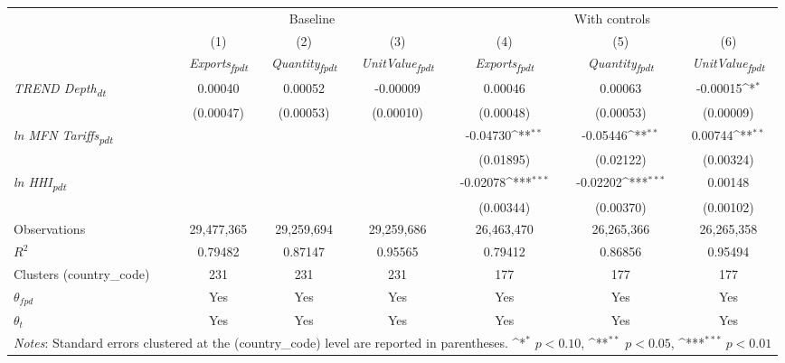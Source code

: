{
\def\sym#1{\ifmmode^{#1}\else\(^{#1}\)\fi}
\begin{tabular}{l*{6}{c}}
\toprule
&\multicolumn{3}{c}{Baseline}&\multicolumn{3}{c}{With controls}\\\cmidrule(lr){2-4}\cmidrule(lr){5-7}
&(1)&(2)&(3)&(4)&(5)&(6)\\
&\textit{Exports\textsubscript{fpdt}}&\textit{Quantity\textsubscript{fpdt}}&\textit{UnitValue\textsubscript{fpdt}}&\textit{Exports\textsubscript{fpdt}}&\textit{Quantity\textsubscript{fpdt}}&\textit{UnitValue\textsubscript{fpdt}}\\
\midrule
\textit{TREND Depth\textsubscript{dt}} & 0.00040 & 0.00052 & -0.00009 & 0.00046 & 0.00063 & -0.00015\sym{*}\\
 & (0.00047) & (0.00053) & (0.00010) & (0.00048) & (0.00053) & (0.00009)\\
\addlinespace
\textit{ln MFN Tariffs\textsubscript{pdt}} &  &  &  & -0.04730\sym{**} & -0.05446\sym{**} & 0.00744\sym{**}\\
 &  &  &  & (0.01895) & (0.02122) & (0.00324)\\
\addlinespace
\textit{ln HHI\textsubscript{pdt}} &  &  &  & -0.02078\sym{***} & -0.02202\sym{***} & 0.00148\\
 &  &  &  & (0.00344) & (0.00370) & (0.00102)\\
\midrule
Observations & 29,477,365 & 29,259,694 & 29,259,686 & 26,463,470 & 26,265,366 & 26,265,358\\
$R^{2}$ & 0.79482 & 0.87147 & 0.95565 & 0.79412 & 0.86856 & 0.95494\\
Clusters (country_code) & 231 & 231 & 231 & 177 & 177 & 177\\
$\theta_{fpd}$ & Yes & Yes & Yes & Yes & Yes & Yes\\
$\theta_{t}$ & Yes & Yes & Yes & Yes & Yes & Yes\\
\bottomrule
\multicolumn{7}{l}{\footnotesize \textit{Notes}: Standard errors clustered at the (country_code) level are reported in parentheses. \sym{*} \(p<0.10\), \sym{**} \(p<0.05\), \sym{***} \(p<0.01\)}\\
\end{tabular}
}
